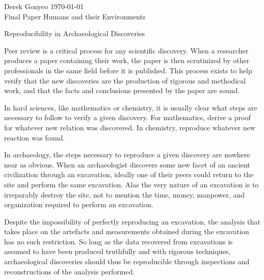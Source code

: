 \documentclass[12pt]{article}
\begin{document}
\noindent Derek Gonyeo \hfill \today \\
Final Paper \hfill Humans and their Environments

\begin{center}
    \huge Reproducibility in Archaeological Discoveries
\end{center}

\normalsize

%
%
%
%
%

Peer review is a critical process for any scientific discovery. When a
researcher produces a paper containing their work, the paper is then
scrutinized by other professionals in the same field before it is published.
This process exists to help verify that the new discoveries are the production
of rigorous and methodical work, and that the facts and conclusions presented
by the paper are sound. 

In hard sciences, like mathematics or chemistry, it is usually clear what steps
are necessary to follow to verify a given discovery. For mathematics, derive a
proof for whatever new relation was discovered. In chemistry, reproduce
whatever new reaction was found.

In archaeology, the steps necessary to reproduce a given discovery are nowhere
near as obvious. When an archaeologist discovers some new facet of an ancient
civilization through an excavation, ideally one of their peers could return to
the site and perform the same excavation. Alas the very nature of an excavation
is to irreparably destroy the site, not to mention the time, money, manpower,
and organization required to perform an excavation.

Despite the impossibility of perfectly reproducing an excavation, the analysis
that takes place on the artefacts and measurements obtained during the
excavation has no such restriction. So long as the data recovered from
excavations is assumed to have been produced truthfully and with rigorous
techniques, archaeological discoveries should thus be reproducible through
inspections and reconstructions of the analysis performed.
\end{document}
